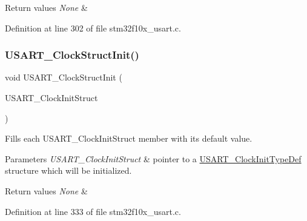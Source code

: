 \begin{DoxyRetVals}{Return values}
{\em None} & \\
\hline
\end{DoxyRetVals}


Definition at line 302 of file stm32f10x\+\_\+usart.\+c.

\mbox{\label{group___u_s_a_r_t___private___functions_ga59df27d0adda18b16ee28d47672cc724}} 
\subsubsection{\texorpdfstring{U\+S\+A\+R\+T\+\_\+\+Clock\+Struct\+Init()}{USART\_ClockStructInit()}}
{\footnotesize\ttfamily void U\+S\+A\+R\+T\+\_\+\+Clock\+Struct\+Init (\begin{DoxyParamCaption}\item[{\hyperlink{struct_u_s_a_r_t___clock_init_type_def}{U\+S\+A\+R\+T\+\_\+\+Clock\+Init\+Type\+Def} $\ast$}]{U\+S\+A\+R\+T\+\_\+\+Clock\+Init\+Struct }\end{DoxyParamCaption})}



Fills each U\+S\+A\+R\+T\+\_\+\+Clock\+Init\+Struct member with its default value. 


\begin{DoxyParams}{Parameters}
{\em U\+S\+A\+R\+T\+\_\+\+Clock\+Init\+Struct} & pointer to a \hyperlink{struct_u_s_a_r_t___clock_init_type_def}{U\+S\+A\+R\+T\+\_\+\+Clock\+Init\+Type\+Def} structure which will be initialized. \\
\hline
\end{DoxyParams}

\begin{DoxyRetVals}{Return values}
{\em None} & \\
\hline
\end{DoxyRetVals}


Definition at line 333 of file stm32f10x\+\_\+usart.\+c.

\mbox{\label{group___u_s_a_r_t___private___functions_ga45e51626739c5f22a6567c8a85d1d85e}} 
